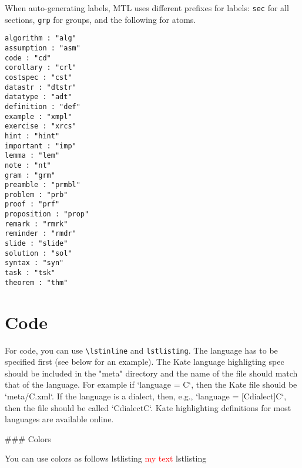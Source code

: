 \begin{example}
\begin{noten}
\begin{important}
\begin{definition}[Group]
When auto-generating labels, MTL uses different prefixes for labels: \lstinline`sec` for all sections, \lstinline`grp` for groups, and the following for atoms.
%
\begin{lstlisting}
algorithm : "alg"
assumption : "asm"
code : "cd"
corollary : "crl"
costspec : "cst"
datastr : "dtstr"
datatype : "adt"
definition : "def"
example : "xmpl"
exercise : "xrcs"
hint : "hint"
important : "imp"
lemma : "lem"
note : "nt"
gram : "grm"
preamble : "prmbl"
problem : "prb"
proof : "prf"
proposition : "prop"
remark : "rmrk"
reminder : "rmdr"
slide : "slide"
solution : "sol"
syntax : "syn"
task : "tsk"
theorem : "thm"
\end{lstlisting}

\section{Code}

For code, you can use \lstinline`\lstinline` and \lstinline`lstlisting`.  The language has to be specified first (see below for an example).  The Kate language highligting spec should be included in the "meta" directory and the name of the file should match that of the language.  For example if `language = C`, then the Kate file should be `meta/C.xml`.  If the language is a dialect, then, e.g., `language = {[Cdialect]C}`, then the file should be called `CdialectC`.  Kate highlighting definitions for most languages are available online.



### Colors

You can use colors as follows
{lstlisting}
\textcolor{red}{my text}
{lstlisting}


\end{definition}
\end{important}
\end{noten}
\end{example}
